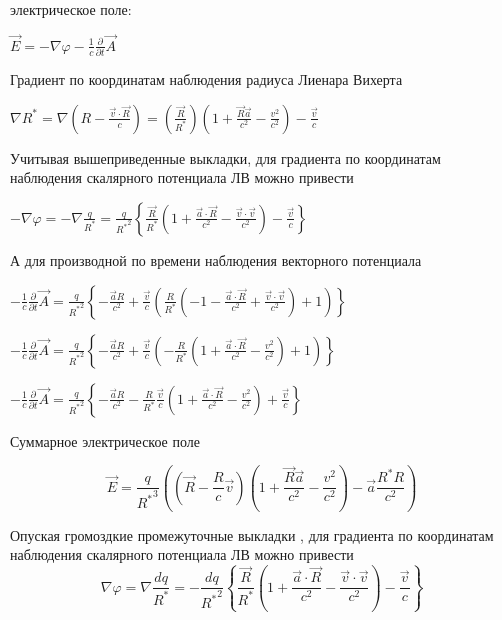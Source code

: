 \documentclass[11pt]{article}
\begin{document}
    электрическое поле:

\(\vec{E} = -\nabla\varphi - \frac{1}{c}\frac{\partial}{\partial t}\vec{A}\)

    Градиент по координатам наблюдения радиуса Лиенара Вихерта

\(\nabla {{R}^{*}} = \nabla {\left( R-\frac{\overrightarrow{v}\cdot \overrightarrow{R}}{c} \right)} = \left(\frac{\vec{R}}{{{R}^{*}}}\right)\left(1 + \frac{\vec{R}\vec{a}}{c^2}-\frac{v^2}{c^2}\right)-\frac{\vec{v}}{c}\)

    Учитывая вышеприведенные выкладки, для градиента по координатам
наблюдения скалярного потенциала ЛВ можно привести

\(-\nabla \varphi =-\nabla \frac{q}{{{R}^{*}}}=\frac{q}{{{R}^{*}}^{2}}\left\{ \frac{\overrightarrow{R}}{{{R}^{*}}}\left( 1+\frac{\overrightarrow{a}\cdot \overrightarrow{R}}{{{c}^{2}}}-\frac{\overrightarrow{v}\cdot \overrightarrow{v}}{{{c}^{2}}} \right)-\frac{\overrightarrow{v}}{c} \right\}\)

А для производной по времени наблюдения векторного потенциала

\(-\frac{1}{c}\frac{\partial }{\partial t}\overrightarrow{A}=\frac{q}{{{R}^{*}}^{2}}\left\{ -\frac{\overrightarrow{a}R}{{{c}^{2}}}+\frac{\overrightarrow{v}}{c}\left( \frac{R}{{{R}^{*}}}\left( -1-\frac{\overrightarrow{a}\cdot \overrightarrow{R}}{{{c}^{2}}}+\frac{\overrightarrow{v}\cdot \overrightarrow{v}}{{{c}^{2}}} \right)+1 \right) \right\}\)

\(-\frac{1}{c}\frac{\partial }{\partial t}\overrightarrow{A}=\frac{q}{{{R}^{*}}^{2}}\left\{ -\frac{\overrightarrow{a}R}{{{c}^{2}}}+\frac{\overrightarrow{v}}{c}\left( -\frac{R}{{{R}^{*}}}\left( 1+\frac{\overrightarrow{a}\cdot \overrightarrow{R}}{{{c}^{2}}}-\frac{v^2}{{{c}^{2}}} \right)+1 \right) \right\}\)

    \(-\frac{1}{c}\frac{\partial }{\partial t}\overrightarrow{A}=\frac{q}{{{R}^{*}}^{2}}\left\{ -\frac{\overrightarrow{a}R}{{{c}^{2}}}-\frac{R}{{{R}^{*}}}\frac{\overrightarrow{v}}{c}\left( 1+\frac{\overrightarrow{a}\cdot \overrightarrow{R}}{{{c}^{2}}}-\frac{v^2}{{{c}^{2}}} \right)+\frac{\overrightarrow{v}}{c} \right\}\)

Суммарное электрическое поле

\[\vec{E} = \frac{q}{{{R}^{*}}^{3}}\left( \left(\vec{R}-\frac{R}{c}\vec{v} \right) \left(1 + \frac{\vec{R}\vec{a}}{c^2} - \frac{v^2}{c^2} \right) - \vec{a}\frac{{R}^{*}R}{c^2} \right)\]

    Опуская громоздкие промежуточные выкладки \cite{rustot}, для градиента
по координатам наблюдения скалярного потенциала ЛВ можно привести
\[\nabla \varphi =\nabla \frac{dq}{{{R}^{*}}}=-\frac{dq}{{{R}^{*}}^{2}}\left\{ \frac{\overrightarrow{R}}{{{R}^{*}}}\left( 1+\frac{\overrightarrow{a}\cdot \overrightarrow{R}}{{{c}^{2}}}-\frac{\overrightarrow{v}\cdot \overrightarrow{v}}{{{c}^{2}}} \right)-\frac{\overrightarrow{v}}{c} \right\}\]
\end{document}
